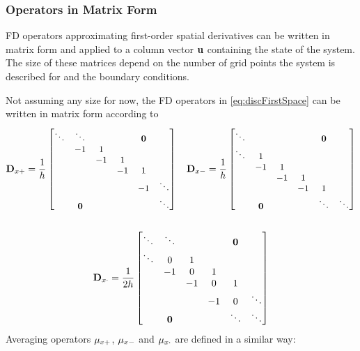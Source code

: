 \subsubsection{Operators in Matrix Form}
FD operators approximating first-order spatial derivatives can be written in matrix form and applied to a column vector $\mathbf{u}$ containing the state of the system. The size of these matrices depend on the number of grid points the system is described for and the boundary conditions. 

Not assuming any size for now, the FD operators in \eqref{eq:discFirstSpace} can be written in matrix form according to
\begin{gather*}\small
    \mathbf{D}_{x+} = \frac{1}{h}\begin{bmatrix}
        \ddots &\ddots & & & \mathbf{0}&\\
         & -1 & 1 & & & \\
        & & -1 & 1 & & \\
        & & & -1 & 1 & \\
        & & & & -1 & \ddots\\
        &\mathbf{0} & & & & \ddots \\
    \end{bmatrix}
    \quad
    \mathbf{D}_{x-} = \frac{1}{h}\begin{bmatrix}
        \ddots & & & & \mathbf{0}&\\
        \ddots & 1 & & & & \\
        & -1 & 1 & & & \\
        & & -1 & 1 & & \\
        & & & -1 & 1 & \\
        &\mathbf{0} & & & \ddots & \ddots \\
    \end{bmatrix}\\
    \\
    \mathbf{D}_{x\cdot} = \frac{1}{2h}\begin{bmatrix}\small
        \ddots &\ddots & & & \mathbf{0}&\\
        \ddots & 0 & 1 & & & \\
        & -1 & 0 & 1 & & \\
        & & -1 & 0 & 1 & \\
        & & & -1 & 0 & \ddots \\
        &\mathbf{0} & & & \ddots & \ddots \\
    \end{bmatrix}\\
\end{gather*}
%
Averaging operators $\mu_{x+}$, $\mu_{x-}$ and $\mu_{x\cdot}$ are defined in a similar way:

